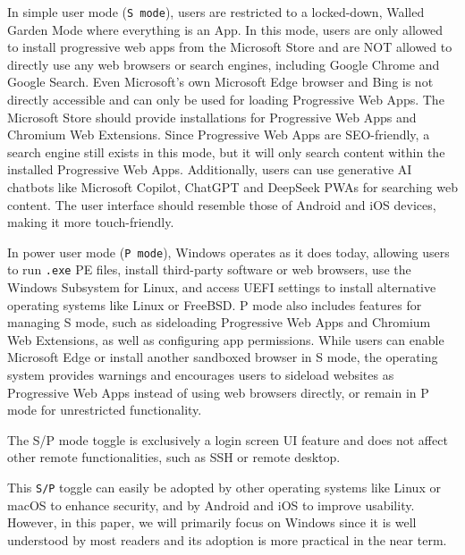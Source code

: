 In simple user mode (\texttt{S mode}), users are restricted to a locked-down, Walled Garden Mode where everything is an App. In this mode, users are only allowed to install progressive web apps from the Microsoft Store and are NOT allowed to directly use any web browsers or search engines, including Google Chrome and Google Search. Even Microsoft's own Microsoft Edge browser and Bing is not directly accessible and can only be used for loading Progressive Web Apps. The Microsoft Store should provide installations for Progressive Web Apps and Chromium Web Extensions. Since Progressive Web Apps are SEO-friendly, a search engine still exists in this mode, but it will only search content within the installed Progressive Web Apps. Additionally, users can use generative AI chatbots like Microsoft Copilot, ChatGPT and DeepSeek PWAs for searching web content. The user interface should resemble those of Android and iOS devices, making it more touch-friendly.

In power user mode (\texttt{P mode}), Windows operates as it does today, allowing users to run \texttt{.exe} PE files, install third-party software or web browsers, use the Windows Subsystem for Linux, and access UEFI settings to install alternative operating systems like Linux or FreeBSD. P mode also includes features for managing S mode, such as sideloading Progressive Web Apps and Chromium Web Extensions, as well as configuring app permissions. While users can enable Microsoft Edge or install another sandboxed browser in S mode, the operating system provides warnings and encourages users to sideload websites as Progressive Web Apps instead of using web browsers directly, or remain in P mode for unrestricted functionality.

The S/P mode toggle is exclusively a login screen UI feature and does not affect other remote functionalities, such as SSH or remote desktop.

This \texttt{S/P} toggle can easily be adopted by other operating systems like Linux or macOS to enhance security, and by Android and iOS to improve usability. However, in this paper, we will primarily focus on Windows since it is well understood by most readers and its adoption is more practical in the near term.



